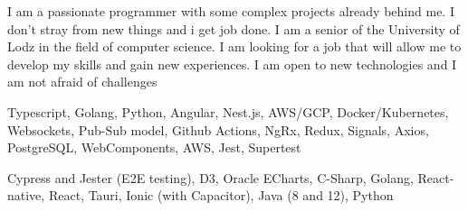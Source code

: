 \documentclass[9pt]{developercv}%
\begin{document}
\begin{minipage}[t]{0.45\textwidth} %
	\vspace{-\baselineskip}

	I am a passionate programmer with some complex projects already behind me. I don't stray from new things and i get job done. I am a senior of the University of Lodz in the field of computer science. I am looking for a job that will allow me to develop my skills and gain new experiences. I am open to new technologies and I am not afraid of challenges
\end{minipage}
\hfill
\begin{minipage}[t]{0.45\textwidth}
	\vspace{-\baselineskip}
	\begin{barchart}{3}
	\end{barchart}
\end{minipage}
\vspace{1.0cm}

\begin{minipage}[t]{0.45\textwidth}
	\vspace{-\baselineskip}

	Typescript, Golang, Python, Angular, Nest.js, AWS/GCP, Docker/Kubernetes,
	Websockets, Pub-Sub model, Github Actions, NgRx, Redux, Signals, Axios,
	PostgreSQL, WebComponents, AWS, Jest, Supertest
\end{minipage}
\hfill
\begin{minipage}[t]{0.45\textwidth}
	\vspace{-\baselineskip}

	Cypress and Jester (E2E testing), D3, Oracle ECharts, C-Sharp, Golang, React-native, React, Tauri, Ionic (with Capacitor), Java (8 and 12), Python
\end{minipage}
\vspace{1.0cm}

\end{document}

